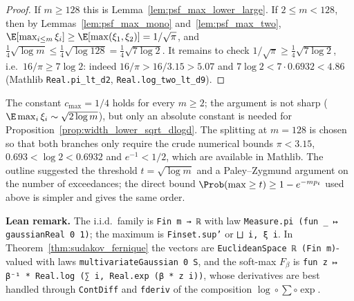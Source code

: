 \begin{proof}
\leanok
{}
If $m\ge128$ this is Lemma~\ref{lem:psf_max_lower_large}. If $2\le m<128$, then by
Lemmas~\ref{lem:psf_max_mono} and~\ref{lem:psf_max_two},
$\E[\max_{i\le m}\xi_i]\ge\E[\max(\xi_1,\xi_2)] = 1/\sqrt\pi$, and
$\frac14\sqrt{\log m} \le \frac14\sqrt{\log 128} = \frac14\sqrt{7\log2}$. It remains to check
$1/\sqrt\pi\ge\frac14\sqrt{7\log2}$, i.e.\ $16/\pi\ge7\log2$: indeed $16/\pi > 16/3.15 > 5.07$
and $7\log 2 < 7\cdot0.6932 < 4.86$ (Mathlib \texttt{Real.pi\_lt\_d2},
\texttt{Real.log\_two\_lt\_d9}).
\end{proof}

\begin{remark}[Constants]\label{rem:psf_constants}
The constant $c_{\max} = 1/4$ holds for every $m\ge2$; the argument is not sharp
($\E\max_i\xi_i\sim\sqrt{2\log m}$), but only an absolute constant is needed for
Proposition~\ref{prop:width_lower_sqrt_dlogd}. The splitting at $m = 128$ is chosen so that
both branches only require the crude numerical bounds $\pi<3.15$, $0.693<\log2<0.6932$ and
$e^{-1}<1/2$, which are available in Mathlib. The outline suggested the threshold
$t = \sqrt{\log m}$ and a Paley--Zygmund argument on the number of exceedances; the direct
bound $\Prob(\max\ge t)\ge1-e^{-mp_t}$ used above is simpler and gives the same order.
\end{remark}

\textbf{Lean remark.} The i.i.d.\ family is \texttt{Fin m → ℝ} with law
\texttt{Measure.pi (fun \_ ↦ gaussianReal 0 1)}; the maximum is \texttt{Finset.sup'} or
\texttt{⨆ i, ξ i}. In Theorem~\ref{thm:sudakov_fernique} the vectors are
\texttt{EuclideanSpace ℝ (Fin m)}-valued with laws \texttt{multivariateGaussian 0 S}, and the
soft-max $F_\beta$ is \texttt{fun z ↦ β⁻¹ * Real.log (∑ i, Real.exp (β * z i))}, whose
derivatives are best handled through \texttt{ContDiff} and \texttt{fderiv} of the composition
$\log\circ\sum\circ\exp$.
